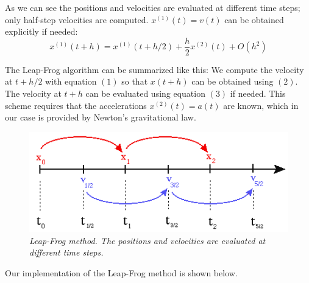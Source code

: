 \documentclass[a4paper,12pt, english]{article}
\begin{document}
As we can see the positions and velocities are evaluated at different time steps; only half-step velocities are computed. $x^{(1)}(t) = v(t)$ can be obtained explicitly if needed:
\[
x^{(1)}(t+h) = x^{(1)}(t+h/2) + \frac{h}{2}x^{(2)}(t) + O(h^2) \tag{3}
\]

The Leap-Frog algorithm can be summarized like this: We compute the velocity at $t+h/2$ with equation $(1)$ so that $x(t+h)$ can be obtained using $(2)$. The velocity at $t+h$ can be evaluated using equation $(3)$ if needed. This scheme requires that the accelerations $x^{(2)}(t) = a(t)$ are known, which in our case is provided by Newton's gravitational law.

\begin{figure}[H]
  \centering \includegraphics[scale=0.5]{leapfrog.png}
  \caption{\textit{Leap-Frog method. The positions and velocities are evaluated at different time steps.}}
\end{figure}

Our implementation of the Leap-Frog method is shown below.
\end{document}
